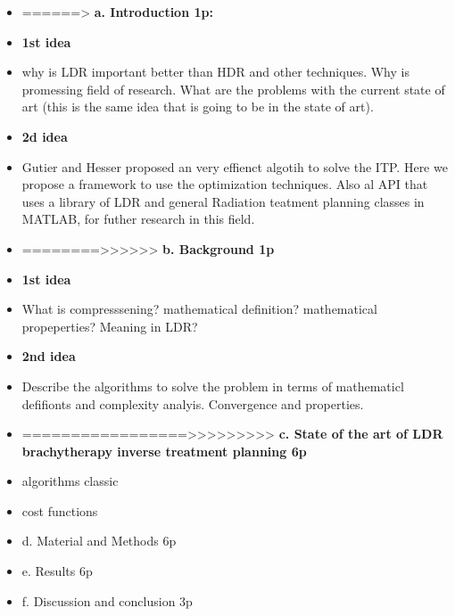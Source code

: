 \documentclass[12pt]{article}
\theoremstyle{definition}
\begin{document}
    \begin{itemize}
        \item ======> \textbf{a.   	Introduction 1p: }
        
        \item \textbf{1st idea}
        \item why is LDR important better than HDR and other techniques. Why is promessing field of research. What are the problems with the current state of art (this is the same idea that is going to be in the state of art). 
        \item \textbf{2d idea}
        \item Gutier and Hesser proposed an very effienct algotih to solve the ITP. Here we propose a framework to use the optimization techniques. Also al API that uses a library of LDR and general Radiation teatment planning classes in MATLAB, for futher research in this field.
        \item ========>>>>>> \textbf{b.   	Background 1p}
        \item \textbf{1st idea}
        \item What is compresssening? mathematical definition? mathematical propeperties? Meaning in LDR?
        \item \textbf{2nd idea}
        \item Describe the algorithms to solve the problem in terms of mathematicl defifionts and complexity analyis. Convergence and properties. 
        \item =================>>>>>>>>> \textbf{c.    State of the art of LDR brachytherapy inverse treatment planning 6p} 
        \item algorithms classic
        \item cost functions
    
        \item d.   	Material and Methods 6p
        \item e.   	Results 6p
        \item f.    Discussion and conclusion 3p
    \end{itemize}

\end{document}
